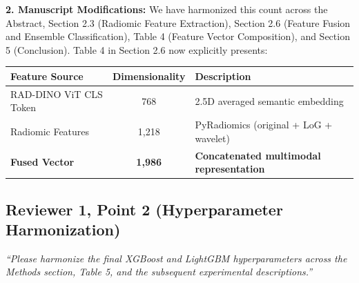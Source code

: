 \documentclass[11pt,a4paper]{article}
\newcommand{\reviewer}[1]{{\color{reviewgray}\textit{#1}}}
\newenvironment{authorresponse}{\par\begingroup\color{authorblue}}{\endgroup\par}
\begin{document}
\begin{authorresponse}
\textbf{2. Manuscript Modifications:}
We have harmonized this count across the Abstract, Section 2.3 (Radiomic Feature Extraction), Section 2.6 (Feature Fusion and Ensemble Classification), Table 4 (Feature Vector Composition), and Section 5 (Conclusion). Table 4 in Section 2.6 now explicitly presents:
\begin{center}
\begin{tabular}{lcl}
\toprule
\textbf{Feature Source} & \textbf{Dimensionality} & \textbf{Description} \\
\midrule
RAD-DINO ViT CLS Token & 768 & 2.5D averaged semantic embedding \\
Radiomic Features & 1,218 & PyRadiomics (original + LoG + wavelet) \\
\midrule
\textbf{Fused Vector} & \textbf{1,986} & \textbf{Concatenated multimodal representation} \\
\bottomrule
\end{tabular}
\end{center}
\end{authorresponse}

\vspace{1.5em}

\subsection*{Reviewer 1, Point 2 (Hyperparameter Harmonization)}

\reviewer{“Please harmonize the final XGBoost and LightGBM hyperparameters across the Methods section, Table 5, and the subsequent experimental descriptions.”}
\end{document}
